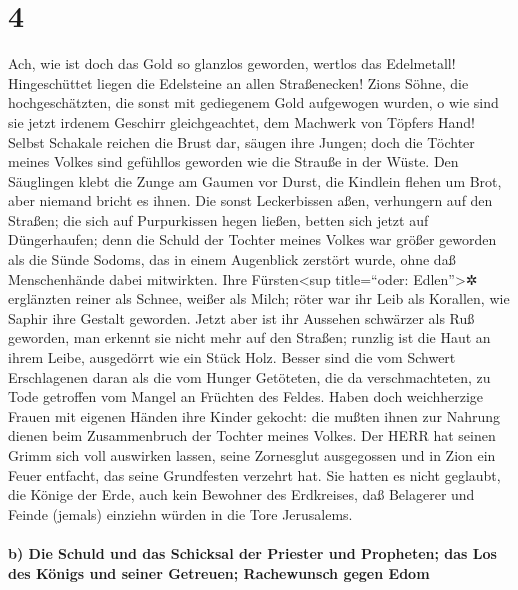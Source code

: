 \hypertarget{section-3}{%
\section{4}\label{section-3}}

Ach, wie ist doch das Gold so glanzlos geworden, wertlos
das Edelmetall! Hingeschüttet liegen die Edelsteine an allen
Straßenecken! Zions Söhne, die hochgeschätzten, die sonst
mit gediegenem Gold aufgewogen wurden, o wie sind sie jetzt irdenem
Geschirr gleichgeachtet, dem Machwerk von Töpfers Hand!
Selbst Schakale reichen die Brust dar, säugen ihre Jungen;
doch die Töchter meines Volkes sind gefühllos geworden wie die Strauße
in der Wüste. Den Säuglingen klebt die Zunge am Gaumen vor
Durst, die Kindlein flehen um Brot, aber niemand bricht es ihnen.
Die sonst Leckerbissen aßen, verhungern auf den Straßen;
die sich auf Purpurkissen hegen ließen, betten sich jetzt auf
Düngerhaufen; denn die Schuld der Tochter meines Volkes
war größer geworden als die Sünde Sodoms, das in einem Augenblick
zerstört wurde, ohne daß Menschenhände dabei mitwirkten.
Ihre Fürsten\textless sup title=``oder:
Edlen''\textgreater✲ erglänzten reiner als Schnee, weißer als Milch;
röter war ihr Leib als Korallen, wie Saphir ihre Gestalt geworden.
Jetzt aber ist ihr Aussehen schwärzer als Ruß geworden,
man erkennt sie nicht mehr auf den Straßen; runzlig ist die Haut an
ihrem Leibe, ausgedörrt wie ein Stück Holz. Besser sind
die vom Schwert Erschlagenen daran als die vom Hunger Getöteten, die da
verschmachteten, zu Tode getroffen vom Mangel an Früchten des Feldes.
Haben doch weichherzige Frauen mit eigenen Händen ihre
Kinder gekocht: die mußten ihnen zur Nahrung dienen beim Zusammenbruch
der Tochter meines Volkes. Der HERR hat seinen Grimm sich
voll auswirken lassen, seine Zornesglut ausgegossen und in Zion ein
Feuer entfacht, das seine Grundfesten verzehrt hat. Sie
hatten es nicht geglaubt, die Könige der Erde, auch kein Bewohner des
Erdkreises, daß Belagerer und Feinde (jemals) einziehn würden in die
Tore Jerusalems.

\hypertarget{b-die-schuld-und-das-schicksal-der-priester-und-propheten-das-los-des-kuxf6nigs-und-seiner-getreuen-rachewunsch-gegen-edom}{%
\paragraph{b) Die Schuld und das Schicksal der Priester und Propheten;
das Los des Königs und seiner Getreuen; Rachewunsch gegen
Edom}\label{b-die-schuld-und-das-schicksal-der-priester-und-propheten-das-los-des-kuxf6nigs-und-seiner-getreuen-rachewunsch-gegen-edom}}


